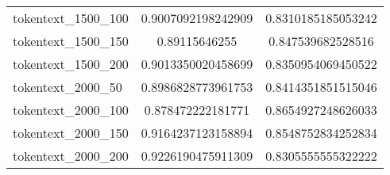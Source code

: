 \begin{table}[h!]
\begin{tabular}{l|c|c}
        tokentext\_1500\_100 & 0.9007092198242909 & 0.8310185185053242 \\
        tokentext\_1500\_150 & 0.89115646255 & 0.847539682528516 \\
        tokentext\_1500\_200 & 0.9013350020458699 & 0.8350954069450522 \\
        \hline
        tokentext\_2000\_50 & 0.8986828773961753 & 0.8414351851515046 \\
        tokentext\_2000\_100 & 0.878472222181771 & 0.8654927248626033 \\
        tokentext\_2000\_150 & 0.9164237123158894 & 0.8548752834252834 \\
        tokentext\_2000\_200 & 0.9226190475911309 & 0.8305555555322222 \\
        \bottomrule
    \end{tabular}
\end{table}
